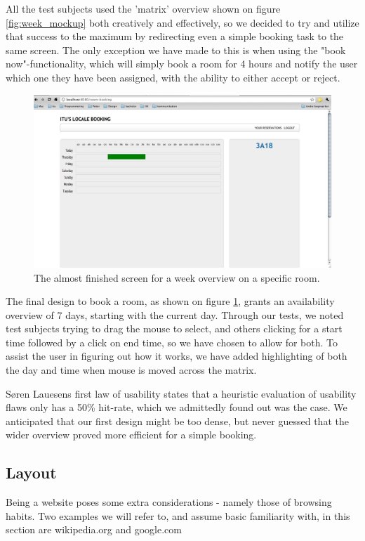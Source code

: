 All the test subjects used the 'matrix' overview shown on figure \ref{fig:week_mockup} both creatively and effectively, so we decided to try and utilize that success to the maximum by redirecting even a simple booking task to the same screen.
The only exception we have made to this is when using the "book now"-functionality, which will simply book a room for 4 hours and notify the user which one they have been assigned, with the ability to either accept or reject.

\begin{figure}[htb]
\begin{center}
\leavevmode
\includegraphics[width=1\textwidth]{images/weekFinal}
\end{center}
\caption{The almost finished screen for a week overview on a specific room.}
\label{fig:week_final}
\end{figure}

The final design to book a room, as shown on figure \ref{fig:week_final}, grants an availability overview of 7 days, starting with the current day. Through our tests, we noted test subjects trying to drag the mouse to select, and others clicking for a start time followed by a click on end time, so we have chosen to allow for both.
To assist the user in figuring out how it works, we have added highlighting of both the day and time when mouse is moved across the matrix.

Søren Lauesens first law of usability\cite{lauesen} states that a heuristic evaluation of usability flaws only has a 50\% hit-rate, which we admittedly found out was the case. We anticipated that our first design might be too dense, but never guessed that the wider overview proved more efficient for a simple booking.


\subsection{Layout}
Being a website poses some extra considerations - namely those of browsing habits. Two examples we will refer to, and assume basic familiarity with, in this section are wikipedia.org and google.com

